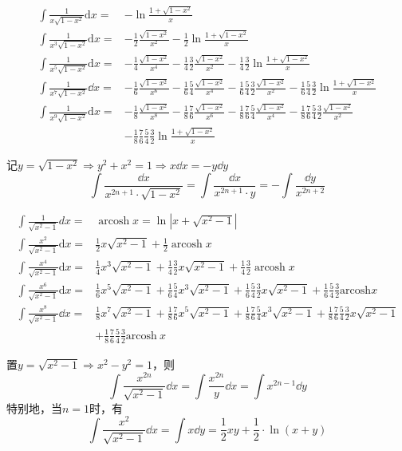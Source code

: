 \begin{theorem}[单位圆根式倒数型]
    \vspace{-15pt}
    \begin{align*}
    \int\frac{1}{x\sqrt{1-x^2}}\mathrm{d}x=&-\ln\frac{1+\sqrt{1-x^2}}{x}\\
    \int\frac{1}{x^{3}\sqrt{1-x^{2}}}\mathrm{d}x=&-\frac{1}{2}\frac{\sqrt{1-x^{2}}}{x^{2}}-\frac{1}{2}\ln\frac{1+\sqrt{1-x^{2}}}{x}\\
    \int\frac{1}{x^5\sqrt{1-x^2}}\mathrm{d}x=&-\frac{1}{4}\frac{\sqrt{1-x^2}}{x^4}-\frac{1}{4}\frac{3}{2}\frac{\sqrt{1-x^2}}{x^2}-\frac{1}{4}\frac{3}{2}\ln\frac{1+\sqrt{1-x^2}}{x}\\
    \int\frac{1}{x^7\sqrt{1-x^2}}\dd x=&-\frac{1}{6}\frac{\sqrt{1-x^2}}{x^6}-\frac{1}{6}\frac{5}{4}\frac{\sqrt{1-x^2}}{x^4}-\frac{1}{6}\frac{5}{4}\frac{3}{2}\frac{\sqrt{1-x^2}}{x^2}-\frac{1}{6}\frac{5}{4}\frac{3}{2}\ln\frac{1+\sqrt{1-x^2}}{x}\\
    \int\frac{1}{x^9\sqrt{1-x^2}}\mathrm{d}x=&-\frac{1}{8}\frac{\sqrt{1-x^{2}}}{x^{8}}-\frac{1}{8}\frac{7}{6}\frac{\sqrt{1-x^{2}}}{x^{6}}-\frac{1}{8}\frac{7}{6}\frac{5}{4}\frac{\sqrt{1-x^{2}}}{x^{4}}-\frac{1}{8}\frac{7}{6}\frac{5}{4}\frac{3}{2}\frac{\sqrt{1-x^{2}}}{x^{2}}\\
    &-\frac{1}{8}\frac{7}{6}\frac{5}{4}\frac{3}{2}\ln\frac{1+\sqrt{1-x^{2}}}{x}
    \end{align*}
\end{theorem}
记$y=\sqrt{1-x^{2}}\Rightarrow y^{2}+x^{2}=1\Rightarrow x\dd x=-y\dd y$
\[\int\frac{\dd x}{x^{2n+1}\cdot\sqrt{1-x^{2}}}=\int\frac{\dd x}{x^{2n+1}\cdot y}=-\int\frac{\dd y}{x^{2n+2}}\]

\begin{theorem}[双曲根式分子型]
    \vspace{-15pt}
    \begin{align*}
    \int\frac{1}{\sqrt{x^{2}-1}}dx=&\operatorname{arcosh}x=\ln\left|x+\sqrt{x^2-1}\right|\\
    \int\frac{x^{2}}{\sqrt{x^{2}-1}}\mathrm{d}x=&\frac{1}{2}x\sqrt{x^2-1}+\frac{1}{2}\operatorname{arcosh}x\\
    \int\frac{x^4}{\sqrt{x^2-1}}\mathrm{d}x=&\frac{1}{4}x^3\sqrt{x^2-1}+\frac{1}{4}\frac{3}{2}x\sqrt{x^2-1}+\frac{1}{4}\frac{3}{2}\operatorname{arcosh}x\\
    \int\frac{x^{6}}{\sqrt{x^{2}-1}}\mathrm{d}x=&\frac{1}{6}x^5\sqrt{x^2-1}+\frac{1}{6}\frac{5}{4}x^3\sqrt{x^2-1}+\frac{1}{6}\frac{5}{4}\frac{3}{2}x\sqrt{x^2-1}+\frac{1}{6}\frac{5}{4}\frac{3}{2}\mathrm{arcosh}x\\
    \int\frac{x^8}{\sqrt{x^2-1}}\dd x=&\frac{1}{8}x^7\sqrt{x^2-1}+\frac{1}{8}\frac{7}{6}x^5\sqrt{x^2-1}+\frac{1}{8}\frac{7}{6}\frac{5}{4}x^3\sqrt{x^2-1}+\frac{1}{8}\frac{7}{6}\frac{5}{4}\frac{3}{2}x\sqrt{x^2-1}\\
    &+\frac{1}{8}\frac{7}{6}\frac{5}{4}\frac{3}{2}\mathrm{arcosh}~x
    \end{align*}
\end{theorem}
置$y=\sqrt{x^{2}-1}\Rightarrow x^{2}-y^{2}=1$，则
\[\int\frac{x^{2n}}{\sqrt{x^{2}-1}}\dd x=\int\frac{x^{2n}}{y}\dd x=\int x^{2n-1}\dd y\]
特别地，当$n=1$时，有
\[\int\frac{x^{2}}{\sqrt{x^{2}-1}}\dd x=\int x\dd y=\frac{1}{2}xy+\frac{1}{2}\cdot\ln(x+y)\]

